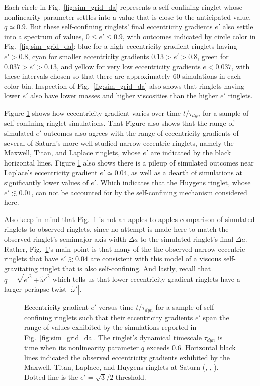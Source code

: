 \documentclass[preprint]{aastex62}
\begin{document}
Each circle in Fig.\ \ref{fig:sim_grid_da} represents a self-confining ringlet whose
nonlinearity parameter settles into a value that is close to the anticipated value, $q\simeq0.9$.
But these self-confining ringlets' final eccentricity gradients $e'$ also settle 
into a spectrum of values, $0\le e' \le 0.9$, with
outcomes indicated by circle color in Fig.\ \ref{fig:sim_grid_da}:
blue for a high--eccentricity gradient ringlets having 
$e'> 0.8$, cyan for smaller eccentricity gradients $0.13>e'>0.8$, green for $0.037>e'>0.13$,
and yellow for very low eccentricity gradients $e<0.037$,
with these intervals chosen so that there are approximately 60 simulations in each color-bin.
Inspection of Fig.\ \ref{fig:sim_grid_da} also shows that ringlets having lower $e'$ also have
lower masses and higher viscosities than the higher $e'$ ringlets.

Figure \ref{fig:e_prime_q_vs_time} shows how eccentricity gradient varies over time $t/\tau_{dyn}$
for a sample of  self-confining ringlet simulations. That Figure also shows 
that the range of simulated $e'$ outcomes also agrees with the 
range of eccentricity gradients of several of Saturn's more well-studied narrow eccentric
ringlets, namely the Maxwell, Titan, and Laplace ringlets, whose $e'$ are
indicated by the black horizontal lines.
Figure \ref{fig:e_prime_q_vs_time} also shows there is a pileup of simulated 
outcomes near Laplace's eccentricity gradient $e'\simeq0.04$, as well as a dearth of simulations
at significantly lower values of $e'$. Which indicates that the Huygens ringlet, whose $e'\lesssim0.01$, 
can not be accounted for by the self-confining mechanism considered here.

Also keep in mind that Fig.\ \ref{fig:e_prime_q_vs_time} is not an apples-to-apples comparison 
of simulated ringlets to observed ringlets, since no attempt is made here to match
the observed ringlet's semimajor-axis width $\Delta a$ to the simulated ringlet's final $\Delta a$.
Rather,  Fig.\ \ref{fig:e_prime_q_vs_time}'s main point is that many of the the observed narrow
eccentric ringlets that have $e'\gtrsim0.04$ are consistent with
this model of a viscous self-gravitating ringlet that is also self-confining.
And lastly, recall that $q=\sqrt{e'^2 + \tilde{\omega}'^2}$ which tells us that lower eccentricity gradient
ringlets have a larger periapse twist $|\tilde{\omega}'|$.

\begin{figure}
    \caption{
        \label{fig:e_prime_q_vs_time}
        Eccentricity gradient $e'$ versus time $t/\tau_{dyn}$ for a sample of self-confining
        ringlets such that their eccentricity gradients $e'$ span the range of values
        exhibited by the simulations reported in Fig.\ \ref{fig:sim_grid_da}. 
        The ringlet's dynamical timescale $\tau_{dyn}$ is time when its nonlinearity parameter $q$ exceeds $0.6$.
        Horizontal black lines indicated the observed eccentricity gradients 
        exhibited by the Maxwell, Titan, Laplace, and Huygens ringlets at Saturn 
        (\citealt{Netal14}, \citealt{Fetal16}, \citealt{SH16}). Dotted line is the $e'=\sqrt{3}/2$ threshold.
    }
\end{figure}
\end{document}
